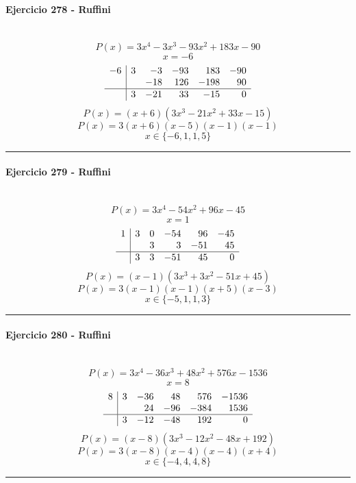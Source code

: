 \documentclass[10pt,a4paper]{article}
\newcommand{\res}[1]{\paragraph{#1}\mbox{}\\[-1.2em]}
\begin{document}
\res{Ejercicio 278 - Ruffini}
\[ P(x)=3 x^{4} - 3 x^{3} - 93 x^{2} + 183 x - 90 \]
\[ x=-6 \]
\[\begin{array}{r|rrrrr}-6 & 3 & -3 & -93 & 183 & -90\\  &  & -18 & 126 & -198 & 90\\\hline  & 3 & -21 & 33 & -15 & 0\end{array}\]
\[ P(x)=(x+6)(3 x^{3} - 21 x^{2} + 33 x - 15) \]
\[ P(x)=3(x+6)(x-5)(x-1)(x-1) \]
\[ \boxed{x\in\{-6,1,1,5\}} \]
\vspace{1mm}\hrule\vspace{2mm}
\res{Ejercicio 279 - Ruffini}
\[ P(x)=3 x^{4} - 54 x^{2} + 96 x - 45 \]
\[ x=1 \]
\[\begin{array}{r|rrrrr}1 & 3 & 0 & -54 & 96 & -45\\  &  & 3 & 3 & -51 & 45\\\hline  & 3 & 3 & -51 & 45 & 0\end{array}\]
\[ P(x)=(x-1)(3 x^{3} + 3 x^{2} - 51 x + 45) \]
\[ P(x)=3(x-1)(x-1)(x+5)(x-3) \]
\[ \boxed{x\in\{-5,1,1,3\}} \]
\vspace{1mm}\hrule\vspace{2mm}
\res{Ejercicio 280 - Ruffini}
\[ P(x)=3 x^{4} - 36 x^{3} + 48 x^{2} + 576 x - 1536 \]
\[ x=8 \]
\[\begin{array}{r|rrrrr}8 & 3 & -36 & 48 & 576 & -1536\\  &  & 24 & -96 & -384 & 1536\\\hline  & 3 & -12 & -48 & 192 & 0\end{array}\]
\[ P(x)=(x-8)(3 x^{3} - 12 x^{2} - 48 x + 192) \]
\[ P(x)=3(x-8)(x-4)(x-4)(x+4) \]
\[ \boxed{x\in\{-4,4,4,8\}} \]
\vspace{1mm}\hrule\vspace{2mm}
\end{document}
